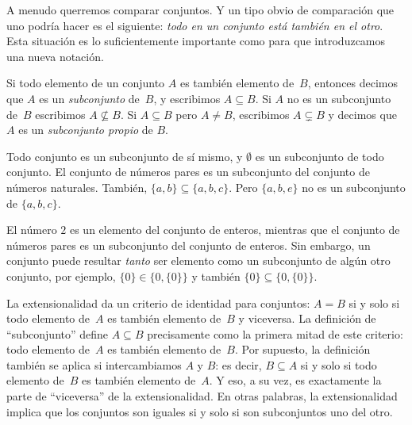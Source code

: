 \documentclass[../../../include/open-logic-section]{subfiles}
\begin{document}

\begin{explain}
A menudo querremos comparar conjuntos. Y un tipo obvio de comparación que uno podría hacer es el siguiente: \emph{todo en un conjunto está también en el otro}. Esta situación es lo suficientemente importante como para que introduzcamos una nueva notación.
\end{explain}

\begin{defn}[Subconjunto]
Si todo elemento de un conjunto $A$ es también elemento de~$B$, entonces decimos que $A$ es un \emph{subconjunto} de~$B$, y escribimos $A \subseteq B$. Si $A$ no es un subconjunto de~$B$ escribimos $A \not\subseteq B$. Si $A \subseteq B$ pero $A \neq B$, escribimos $A \subsetneq B$ y decimos que $A$ es un \emph{subconjunto propio} de $B$.
\end{defn}

\begin{ex}
Todo conjunto es un subconjunto de sí mismo, y $\emptyset$ es un subconjunto de todo conjunto. El conjunto de números pares es un subconjunto del conjunto de números naturales. También, $\{ a, b \} \subseteq \{ a, b, c \}$. Pero $\{ a, b, e \}$ no es un subconjunto de $\{ a, b, c \}$.
\end{ex}

\begin{ex}
El número $2$ es un elemento del conjunto de enteros, mientras que el conjunto de números pares es un subconjunto del conjunto de enteros. Sin embargo, un conjunto puede resultar \emph{tanto} ser elemento como un subconjunto de algún otro conjunto, por ejemplo, $\{0\} \in \{0, \{0\}\}$ y también $\{0\} \subseteq \{0, \{0\}\}$.
\end{ex}

La extensionalidad da un criterio de identidad para conjuntos: $A = B$ si y solo si todo elemento de~$A$ es también elemento de~$B$ y viceversa. La definición de ``subconjunto'' define $A \subseteq B$ precisamente como la primera mitad de este criterio: todo elemento de~$A$ es también elemento de~$B$. Por supuesto, la definición también se aplica si intercambiamos $A$ y $B$: es decir, $B \subseteq A$ si y solo si todo elemento de~$B$ es también elemento de~$A$. Y eso, a su vez, es exactamente la parte de ``viceversa'' de la extensionalidad. En otras palabras, la extensionalidad implica que los conjuntos son iguales si y solo si son subconjuntos uno del otro.
\end{document}
